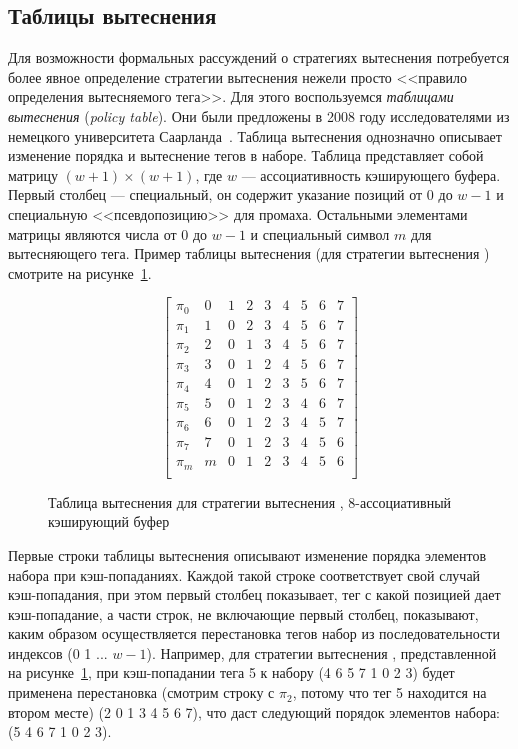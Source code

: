 \subsection{Таблицы вытеснения}

Для возможности формальных рассуждений о стратегиях вытеснения
потребуется более явное определение стратегии вытеснения нежели
просто <<правило определения вытесняемого тега>>. Для этого
воспользуемся \emph{таблицами вытеснения} (\emph{policy table}). Они
были предложены в 2008 году исследователями из немецкого
университета Саарланда~\cite{policy_tables}. Таблица вытеснения
однозначно описывает изменение порядка и вытеснение тегов в наборе.
Таблица представляет собой матрицу $(w{+}1) \times (w{+}1)$, где $w$
--- ассоциативность кэширующего буфера. Первый столбец ---
специальный, он содержит указание позиций от 0 до $w{-}1$ и
специальную <<псевдопозицию>> для промаха. Остальными элементами
матрицы являются числа от 0 до $w{-}1$ и специальный символ $m$ для
вытесняющего тега. Пример таблицы вытеснения (для стратегии
вытеснения \LRU) смотрите на рисунке~\ref{PolicyTableLRU8}.

\begin{figure}[h]
$$ \left[
     \begin{array}{c|cccccccc}
       \pi_0 & 0 & 1 & 2 & 3 & 4 & 5 & 6 & 7 \\
       \pi_1 & 1 & 0 & 2 & 3 & 4 & 5 & 6 & 7 \\
       \pi_2 & 2 & 0 & 1 & 3 & 4 & 5 & 6 & 7 \\
       \pi_3 & 3 & 0 & 1 & 2 & 4 & 5 & 6 & 7 \\
       \pi_4 & 4 & 0 & 1 & 2 & 3 & 5 & 6 & 7 \\
       \pi_5 & 5 & 0 & 1 & 2 & 3 & 4 & 6 & 7 \\
       \pi_6 & 6 & 0 & 1 & 2 & 3 & 4 & 5 & 7 \\
       \pi_7 & 7 & 0 & 1 & 2 & 3 & 4 & 5 & 6 \\
       \pi_m & m & 0 & 1 & 2 & 3 & 4 & 5 & 6 \\
     \end{array}
   \right]
$$
\caption{Таблица вытеснения для стратегии вытеснения \LRU,
8-ассоциативный кэширующий буфер}\label{PolicyTableLRU8}
\end{figure}

Первые строки таблицы вытеснения описывают изменение порядка
элементов набора при кэш-попаданиях. Каждой такой строке
соответствует свой случай кэш-попадания, при этом первый столбец
показывает, тег с какой позицией дает кэш-попадание, а части строк,
не включающие первый столбец, показывают, каким образом
осуществляется перестановка тегов набор из последовательности
индексов (0 1 ... $w{-}1$). Например, для стратегии вытеснения \LRU,
представленной на рисунке~\ref{PolicyTableLRU8}, при кэш-попадании
тега 5 к набору (4 6 5 7 1 0 2 3) будет применена перестановка
(смотрим строку с $\pi_2$, потому что тег 5 находится на втором
месте) (2 0 1 3 4 5 6 7), что даст следующий порядок элементов
набора: (5 4 6 7 1 0 2 3).


